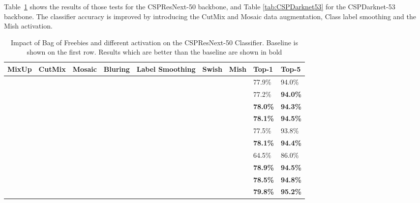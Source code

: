 Table~\ref{tab:cspResNextFeatures} shows the results of those tests for the CSPResNext-50 backbone, and Table \ref{tab:CSPDarknet53} for the CSPDarknet-53 backbone. The classifier accuracy is improved by introducing the CutMix and Mosaic data augmentation, Class label smoothing and the Mish activation. 

\begin{table}[h!]
	\centering
	\begin{tabular}{@{}lllllllll@{}}
		\toprule
		MixUp      & CutMix     & Mosaic     & Bluring    & Label Smoothing & Swish      & Mish       & Top-1           & Top-5           \\ \midrule
		&            &            &            &                 &            &            & 77.9\%          & 94.0\%          \\ \midrule
		\checkmark &            &            &            &                 &            &            & 77.2\%          & \textbf{94.0\%} \\
		& \checkmark &            &            &                 &            &            & \textbf{78.0\%} & \textbf{94.3\%} \\
		&            & \checkmark &            &                 &            &            & \textbf{78.1\%} & \textbf{94.5\%} \\
		&            &            & \checkmark &                 &            &            & 77.5\%          & 93.8\%          \\
		&            &            &            & \checkmark      &            &            & \textbf{78.1\%} & \textbf{94.4\%} \\
		&            &            &            &                 & \checkmark &            & 64.5\%          & 86.0\%          \\
		&            &            &            &                 &            & \checkmark & \textbf{78.9\%} & \textbf{94.5\%} \\
		& \checkmark & \checkmark &            & \checkmark      &            &            & \textbf{78.5\%} & \textbf{94.8\%} \\
												   & \checkmark & \checkmark &            & \checkmark      &            & \checkmark & \textbf{79.8\%} & \textbf{95.2\%} \\ \bottomrule
	\end{tabular}
												   \caption{Impact of Bag of Freebies and different activation on the CSPResNext-50 Classifier. Baseline is shown on the first row. Results which are better than the baseline are shown in bold}
												   \label{tab:cspResNextFeatures}
\end{table}

